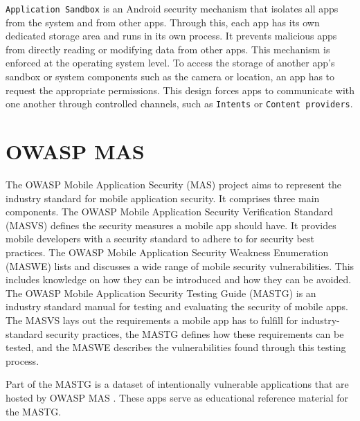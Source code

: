 \texttt{Application Sandbox} \cite{android_concepts_android_app_sandbox} is an Android security mechanism that isolates all apps from the system and from other apps. Through this, each app has its own dedicated storage area and runs in its own process. It prevents malicious apps from directly reading or modifying data from other apps. This mechanism is enforced at the operating system level. To access the storage of another app's sandbox or system components such as the camera or location, an app has to request the appropriate permissions. This design forces apps to communicate with one another through controlled channels, such as \texttt{Intents} or \texttt{Content providers}.

\section{OWASP MAS}

The OWASP Mobile Application Security (MAS) project \cite{owasp_mas_website} aims to represent the industry standard for mobile application security. It comprises three main components. The OWASP Mobile Application Security Verification Standard (MASVS) \cite{owasp_masvs_website} defines the security measures a mobile app should have. It provides mobile developers with a security standard to adhere to for security best practices. The OWASP Mobile Application Security Weakness Enumeration (MASWE) \cite{owasp_maswe_website} lists and discusses a wide range of mobile security vulnerabilities. This includes knowledge on how they can be introduced and how they can be avoided. The OWASP Mobile Application Security Testing Guide (MASTG) \cite{owasp_mastg_website} is an industry standard manual for testing and evaluating the security of mobile apps. The MASVS lays out the requirements a mobile app has to fulfill for industry-standard security practices, the MASTG defines how these requirements can be tested, and the MASWE describes the vulnerabilities found through this testing process. 

Part of the MASTG is a dataset of intentionally vulnerable applications that are hosted by OWASP MAS \cite{owasp_reference_app_website}. These apps serve as educational reference material for the MASTG.   